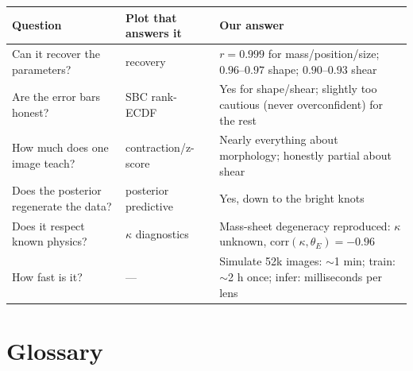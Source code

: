 \documentclass[11pt,a4paper]{article}
\begin{document}
\begin{center}
\begin{tabular}{p{5.2cm}p{4.2cm}p{5.4cm}}
\toprule
\textbf{Question} & \textbf{Plot that answers it} & \textbf{Our answer} \\
\midrule
Can it recover the parameters? & recovery & $r = 0.999$ for mass/position/size; $0.96$--$0.97$ shape; $0.90$--$0.93$ shear \\
Are the error bars honest? & SBC rank-ECDF & Yes for shape/shear; slightly too cautious (never overconfident) for the rest \\
How much does one image teach? & contraction/z-score & Nearly everything about morphology; honestly partial about shear \\
Does the posterior regenerate the data? & posterior predictive & Yes, down to the bright knots \\
Does it respect known physics? & $\kappa$ diagnostics & Mass-sheet degeneracy reproduced: $\kappa$ unknown, corr$(\kappa,\theta_E) = -0.96$ \\
How fast is it? & --- & Simulate 52k images: $\sim$1 min; train: $\sim$2 h once; infer: milliseconds per lens \\
\bottomrule
\end{tabular}
\end{center}

\section{Glossary}
\end{document}
